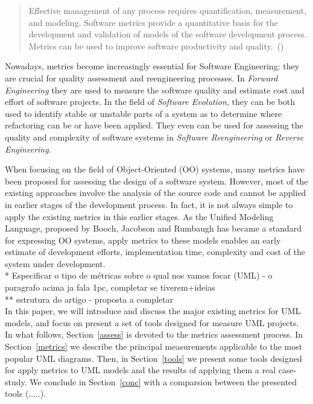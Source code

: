 \begin{quotation}
Effective management of any process requires quantification, measurement, and modeling. Software metrics provide a quantitative basis for the development and validation of models of the software development process. Metrics can be used to improve software productivity and quality.~(\cite{g1:Millis:1998})
\end{quotation}
    
Nowadays, metrics become increasingly essential for Software Engineering: they are crucial for quality assessment and reengineering processes.
In \emph{Forward Engineering} they are used to measure the software quality and estimate cost and effort of software projects\cite{Fenton}.
In the field of \emph{Software Evolution}, they can be both used to identify stable or unstable parts of a system as to determine where refactoring can be or have been applied\cite{Serge}.
They even can be used for assessing the quality and complexity of software systems in \emph{Software Reengineering} or \emph{Reverse Engineering}\cite{43044}.

When focusing on the field of Object-Oriented (OO) systems, many metrics have been proposed for assessing the design of a software system.
However, most of the existing approaches involve the analysis of the source code and cannot be applied in earlier stages of the development process.
In fact, it is not always simple to apply the existing metrics in this earlier stages. 
As the \textsf{Unified Modeling Language}, proposed by Booch, Jacobson and Rumbaugh\cite{USDPuml} has became a standard for expressing OO systems, apply metrics to these models enables an early estimate of development efforts, implementation time, complexity and cost of the system under development. \\

  * Especificar o tipo de métricas sobre o qual nos vamos focar (UML) - o paragrafo acima ja fala 1pc, completar se tiverem+ideias\\
  
  ** estrutura do artigo - proposta a completar\\
  
In this paper, we will introduce and discuss the major existing metrics for UML models, and focus on present a set of tools designed for measure UML projects.
In what follows, Section~\ref{assess} is devoted to the metrics assessment process.
In Section~\ref{metrics} we describe the principal measurements applicable to the most popular UML diagrams.
Then, in Section~\ref{tools} we present some tools designed for apply metrics to UML models and the results of applying them a real case-study.
We conclude in Section~\ref{conc} with a comparsion between the presented tools (.....).
  
    


